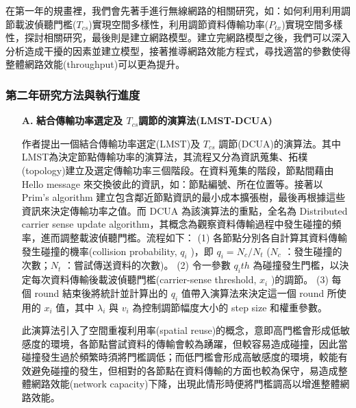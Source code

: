 \documentclass[12pt,a4paper]{article}
\begin{document}
\begin{description}
\begin{enumerate}
在第一年的規畫裡，我們會先著手進行無線網路的相關研究，如：如何利用利用調節載波偵聽門檻($T_{cs}$)實現空間多樣性，利用調節資料傳輸功率($P_{tx}$)實現空間多樣性，探討相關研究，最後則是建立網路模型。建立完網路模型之後，我們可以深入分析造成干擾的因素並建立模型，接著推導網路效能方程式，尋找適當的參數使得整體網路效能(throughput)可以更為提升。\\


\end{enumerate}
\subsubsection{第二年研究方法與執行進度}

\begin{enumerate}
\setlength\parindent{2em}    %
\item [\bf A.]{\textbf{\Kai 結合傳輸功率選定及 $T_{cs}$調節的演算法(LMST-DCUA) }}\\
\vspace{-2mm}

作者\cite{tmc09_aphycs}提出一個結合傳輸功率選定(LMST)及 $T_{cs}$ 調節(DCUA)的演算法。其中 LMST為決定節點傳輸功率的演算法，其流程又分為資訊蒐集、拓樸(topology)建立及選定傳輸功率三個階段。在資料蒐集的階段，節點間藉由 Hello message 來交換彼此的資訊，如：節點編號、所在位置等。接著以 Prim's algorithm 建立包含鄰近節點資訊的最小成本擴張樹，最後再根據這些資訊來決定傳輸功率之值。而 DCUA 為該演算法的重點，全名為 Distributed carrier sense update algorithm，其概念為觀察資料傳輸過程中發生碰撞的頻率，進而調整載波偵聽門檻。流程如下： 
(1) 各節點分別各自計算其資料傳輸發生碰撞的機率(collision probability, $q_i$ )，即 $q_i = N_c / N_t$ ($N_c$ ：發生碰撞的次數；$N_t$ ：嘗試傳送資料的次數)。 
(2) 令一參數 $q_{i}th$ 為碰撞發生門檻，以決定每次資料傳輸後載波偵聽門檻(carrier-sense threshold, $x_i$ )的調節。 
(3) 每個 round 結束後將統計並計算出的 $q_i$ 值帶入演算法來決定這一個 round 所使用的 $x_i$ 值，其中 $\lambda_i$ 與 $v_i$ 為控制調節幅度大小的 step size 和權重參數。 

此演算法引入了空間重複利用率(spatial reuse)的概念，意即高門檻會形成低敏感度的環境，各節點嘗試資料的傳輸會較為踴躍，但較容易造成碰撞，因此當碰撞發生過於頻繁時須將門檻調低；而低門檻會形成高敏感度的環境，較能有效避免碰撞的發生，但相對的各節點在資料傳輸的方面也較為保守，易造成整體網路效能(network capacity)下降，出現此情形時便將門檻調高以增進整體網路效能。\\



\end{enumerate}
\end{description}
\end{document}
